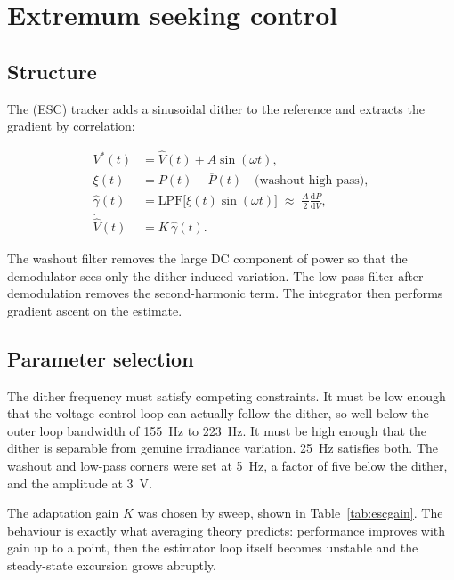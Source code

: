 \section{Extremum seeking control}

\subsection{Structure}

The  (ESC) tracker adds a sinusoidal dither to the
reference and extracts the gradient by correlation:

\begin{align}
V^\ast(t) &= \hat V(t) + A\sin(\omega t), \\
\xi(t) &= P(t) - \overline{P}(t) \quad\text{(washout high-pass)}, \\
\hat\gamma(t) &= \mathrm{LPF}\big[\xi(t)\sin(\omega t)\big] \;\approx\; \tfrac{A}{2}\frac{\mathrm{d}P}{\mathrm{d}V}, \\
\dot{\hat V}(t) &= K\,\hat\gamma(t) .
\end{align}

The washout filter removes the large DC component of power so that the
demodulator sees only the dither-induced variation. The low-pass filter after
demodulation removes the second-harmonic term. The integrator then performs
gradient ascent on the estimate.

\subsection{Parameter selection}

The dither frequency must satisfy competing constraints. It must be low enough
that the voltage control loop can actually follow the dither, so well below the
outer loop bandwidth of \SI{155}{\hertz} to \SI{223}{\hertz}. It must be high
enough that the dither is separable from genuine irradiance variation.
\SI{25}{\hertz} satisfies both. The washout and low-pass corners were set at
\SI{5}{\hertz}, a factor of five below the dither, and the amplitude at
\SI{3}{\volt}.

The adaptation gain $K$ was chosen by sweep, shown in Table~\ref{tab:escgain}.
The behaviour is exactly what averaging theory predicts: performance improves
with gain up to a point, then the estimator loop itself becomes unstable and the
steady-state excursion grows abruptly.

